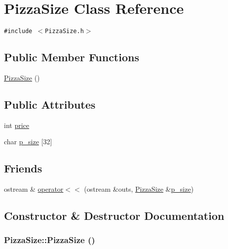 \hypertarget{class_pizza_size}{
\section{Pizza\-Size Class Reference}
\label{class_pizza_size}
}
{\tt \#include $<$Pizza\-Size.h$>$}

\subsection*{Public Member Functions}
\begin{CompactItemize}
\item 
\hyperlink{class_pizza_size_62ec78b338c07d4c98932bc7b71d2320}{Pizza\-Size} ()
\end{CompactItemize}
\subsection*{Public Attributes}
\begin{CompactItemize}
\item 
int \hyperlink{class_pizza_size_78a5eb43deef9a7b5b9ce157b9d52ac4}{price}
\item 
char \hyperlink{class_pizza_size_42c17e691e40072f9ef449e812c5ecc3}{p\_\-size} \mbox{[}32\mbox{]}
\end{CompactItemize}
\subsection*{Friends}
\begin{CompactItemize}
\item 
ostream \& \hyperlink{class_pizza_size_aeefabdbf1b3e9ffbc20170fcdee8bec}{operator$<$$<$} (ostream \&outs, \hyperlink{class_pizza_size}{Pizza\-Size} \&\hyperlink{class_pizza_size_42c17e691e40072f9ef449e812c5ecc3}{p\_\-size})
\end{CompactItemize}


\subsection{Constructor \& Destructor Documentation}
\hypertarget{class_pizza_size_62ec78b338c07d4c98932bc7b71d2320}{
\subsubsection[PizzaSize]{\setlength{\rightskip}{0pt plus 5cm}Pizza\-Size::Pizza\-Size ()}}
\label{class_pizza_size_62ec78b338c07d4c98932bc7b71d2320}




